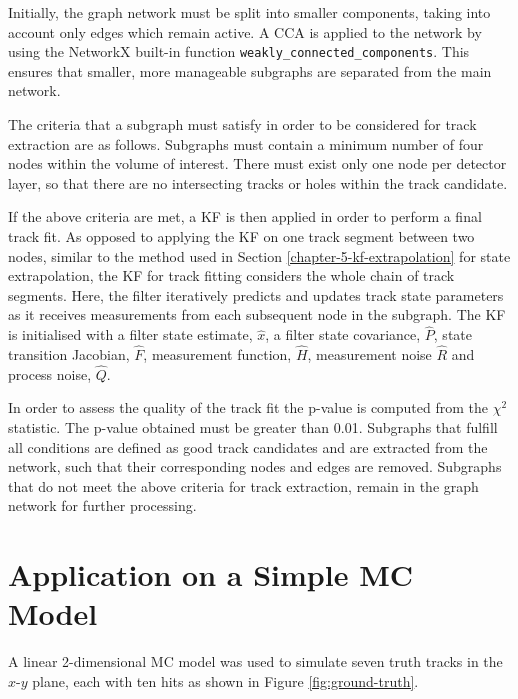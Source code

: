 Initially, the graph network must be split into smaller components, taking into account only edges which remain active. A CCA is applied to the network by using the NetworkX built-in function \texttt{weakly\_connected\_components}. This ensures that smaller, more manageable subgraphs are separated from the main network.

The criteria that a subgraph must satisfy in order to be considered for track extraction are as follows. Subgraphs must contain a minimum number of four nodes within the volume of interest. There must exist only one node per detector layer, so that there are no intersecting tracks or holes within the track candidate. 

If the above criteria are met, a KF is then applied in order to perform a final track fit. As opposed to applying the KF on one track segment between two nodes, similar to the method used in Section \ref{chapter-5-kf-extrapolation} for state extrapolation, the KF for track fitting considers the whole chain of track segments. Here, the filter iteratively predicts and updates track state parameters as it receives measurements from each subsequent node in the subgraph. The KF is initialised with a filter state estimate, $\hat{x}$, a filter state covariance, $\hat{P}$, state transition Jacobian, $\hat{F}$, measurement function, $\hat{H}$, measurement noise $\hat{R}$ and process noise, $\hat{Q}$.

In order to assess the quality of the track fit the p-value is computed from the $\chi^2$ statistic. The p-value obtained must be greater than 0.01. Subgraphs that fulfill all conditions are defined as good track candidates and are extracted from the network, such that their corresponding nodes and edges are removed. Subgraphs that do not meet the above criteria for track extraction, remain in the graph network for further processing.





\section{Application on a Simple MC Model}
\label{gnn-application-toy-model}

A linear 2-dimensional MC model was used to simulate seven truth tracks in the $x$-$y$ plane, each with ten hits as shown in Figure \ref{fig:ground-truth}. 

